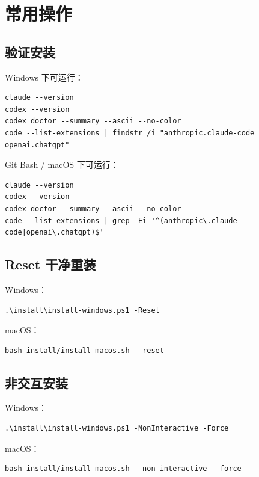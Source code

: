\documentclass[11pt,a4paper]{ctexbook}
\begin{document}
\chapter{常用操作}

\section{验证安装}

Windows 下可运行：

\begin{lstlisting}[language={}]
claude --version
codex --version
codex doctor --summary --ascii --no-color
code --list-extensions | findstr /i "anthropic.claude-code openai.chatgpt"
\end{lstlisting}

Git Bash / macOS 下可运行：

\begin{lstlisting}[language={}]
claude --version
codex --version
codex doctor --summary --ascii --no-color
code --list-extensions | grep -Ei '^(anthropic\.claude-code|openai\.chatgpt)$'
\end{lstlisting}

\section{Reset 干净重装}

Windows：

\begin{lstlisting}[language={}]
.\install\install-windows.ps1 -Reset
\end{lstlisting}

macOS：

\begin{lstlisting}[language={}]
bash install/install-macos.sh --reset
\end{lstlisting}

\section{非交互安装}

Windows：

\begin{lstlisting}[language={}]
.\install\install-windows.ps1 -NonInteractive -Force
\end{lstlisting}

macOS：

\begin{lstlisting}[language={}]
bash install/install-macos.sh --non-interactive --force
\end{lstlisting}
\end{document}
